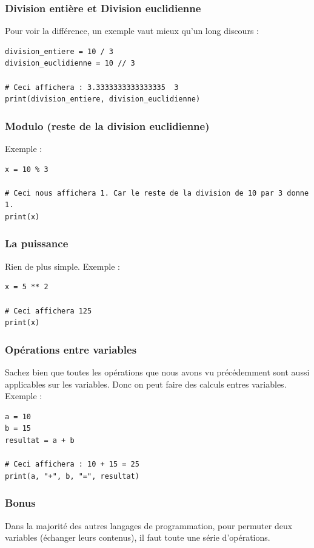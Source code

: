 \documentclass[12pt]{article}
\begin{document}
        \subsubsection{Division entière et Division euclidienne}
            Pour voir la différence, un exemple vaut mieux qu'un long discours :
            \begin{lstlisting}[style=code]
division_entiere = 10 / 3
division_euclidienne = 10 // 3

# Ceci affichera : 3.3333333333333335  3
print(division_entiere, division_euclidienne)
            \end{lstlisting}

        \subsubsection{Modulo (reste de la division euclidienne)}
            Exemple :
            \begin{lstlisting}[style=code, breaklines=false]
x = 10 % 3

# Ceci nous affichera 1. Car le reste de la division de 10 par 3 donne 1.
print(x) 
            \end{lstlisting}
        \subsubsection{La puissance}
            Rien de plus simple. Exemple :
            \begin{lstlisting}[style=code]
x = 5 ** 2

# Ceci affichera 125
print(x)
            \end{lstlisting}
        

        \subsubsection{Opérations entre variables}
            Sachez bien que toutes les opérations que nous avons vu précédemment sont aussi applicables sur les variables.
            Donc on peut faire des calculs entres variables. Exemple : 
            \begin{lstlisting}[style=code]
a = 10
b = 15
resultat = a + b

# Ceci affichera : 10 + 15 = 25
print(a, "+", b, "=", resultat)
            \end{lstlisting}

        \subsubsection{Bonus}
            Dans la majorité des autres langages de programmation, pour permuter deux variables
            (échanger leurs contenus), il faut toute une série d'opérations. 
\end{document}
